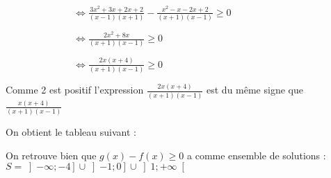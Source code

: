\begin{corrige}
\begin{enumerate}
          \par
          $\phantom{f\left(x\right)\leqslant g\left(x\right)} \Leftrightarrow  \frac{3x^{2}+3x+2x+2}{\left(x-1\right)\left(x+1\right)}-\frac{x^{2}-x-2x+2}{\left(x+1\right)\left(x-1\right)} \geqslant  0  $
          \par
          $\phantom{f\left(x\right)\leqslant g\left(x\right)} \Leftrightarrow  \frac{2x^{2}+8x}{\left(x+1\right)\left(x-1\right)} \geqslant  0  $
          \par
          $\phantom{f\left(x\right)\leqslant g\left(x\right)} \Leftrightarrow  \frac{2x\left(x+4\right)}{\left(x+1\right)\left(x-1\right)} \geqslant  0  $
          \par
          Comme 2 est positif l'expression $\frac{2x\left(x+4\right)}{\left(x+1\right)\left(x-1\right)}$ est du même signe que $\frac{x\left(x+4\right)}{\left(x+1\right)\left(x-1\right)}$
          \par
          On obtient le tableau suivant :
\\

\begin{center}
\end{center}

          On retrouve bien que $g\left(x\right)-f\left(x\right)\geqslant 0$ a comme ensemble de solutions :  $S=\left]-\infty ;-4\right] \cup  \left]-1;0\right] \cup  \left]1;+\infty \right[$
     \end{enumerate}
\end{corrige}
